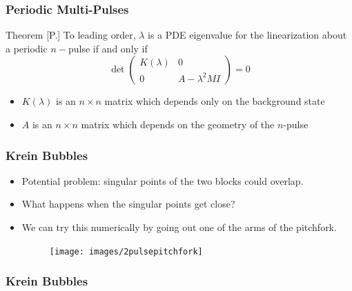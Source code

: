 \documentclass[16pt]{beamer}
\begin{document}
\begin{frame}
\frametitle{Periodic Multi-Pulses} 
	\fontsize{14}{7.2}\selectfont
    \begin{block}{Theorem [P.]}
    To leading order, $\lambda$ is a PDE eigenvalue for the linearization about a periodic $n-$pulse if and only if 
    \[
    \det\begin{pmatrix}K(\lambda) & 0 \\ 0 & A - \lambda^2  M I \end{pmatrix} = 0
    \]
    \begin{itemize}
    	\item $K(\lambda)$ is an $n \times n$ matrix which depends only on the background state
    	\item $A$ is an $n \times n$ matrix which depends on the geometry of the $n$-pulse
    \end{itemize}
    \end{block}
\end{frame}

\begin{frame}
	\frametitle{Krein Bubbles}
	\fontsize{16}{7.2}\selectfont
	\begin{itemize}
		\item Potential problem: singular points of the two blocks could overlap.
		\vspace{0.5cm}
		\item What happens when the singular points get close?
		\vspace{0.5cm}
		\item We can try this numerically by going out one of the arms of the pitchfork.

		\begin{figure}
		\begin{center}
		\texttt{[image: images/2pulsepitchfork]}
		\end{center}
		\end{figure}
	\end{itemize}
\end{frame}

\begin{frame}
	\frametitle{Krein Bubbles}
	\fontsize{16}{7.2}\selectfont
	\begin{center}
	\end{center}
\end{frame}
\end{document}
